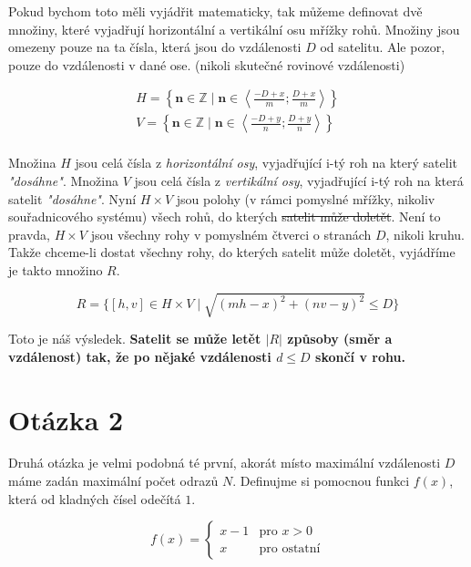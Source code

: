 \documentclass[11pt, a4paper]{article}
\begin{document}
    Pokud bychom toto měli vyjádřit matematicky, tak můžeme definovat dvě množiny, které vyjadřují horizontální a vertikální osu mřížky rohů.
    Množiny jsou omezeny pouze na ta čísla, která jsou do vzdálenosti $D$ od satelitu.
    Ale pozor, pouze do vzdálenosti v dané ose.
    (nikoli skutečné rovinové vzdálenosti)

    \begin{gather*}
        H = \left\{ \mathbf{n} \in \mathbb{Z} \mid \mathbf{n} \in \left\langle \frac{-D+x}{m}; \frac{D+x}{m} \right\rangle \right\}\\
        V = \left\{ \mathbf{n} \in \mathbb{Z} \mid \mathbf{n} \in \left\langle \frac{-D+y}{n}; \frac{D+y}{n} \right\rangle \right\}\\
    \end{gather*}

    Množina $H$ jsou celá čísla z \emph{horizontální osy}, vyjadřující i-tý roh na který satelit \emph{"dosáhne"}.
    Množina $V$ jsou celá čísla z \emph{vertikální osy}, vyjadřující i-tý roh na která satelit \emph{"dosáhne"}.
    Nyní $H \times V$ jsou polohy (v rámci pomyslné mřížky, nikoliv souřadnicového systému) všech rohů, do kterých \sout{satelit může doletět}.
    Není to pravda, $H \times V$ jsou všechny rohy v pomyslném čtverci o stranách $D$, nikoli kruhu.
    Takže chceme-li dostat všechny rohy, do kterých satelit může doletět, vyjádříme je takto množino $R$.

    \[
        R = \{ [h, v] \in H \times V \mid \sqrt{(mh - x)^2+(nv - y)^2} \leq D \}
    \]

    Toto je náš výsledek.
    \textbf{Satelit se může letět $|R|$ způsoby (směr a vzdálenost) tak, že po nějaké vzdálenosti $d \leq D$ skončí v rohu.}


    \section{Otázka 2}
    \label{sec:otazka-2}

    Druhá otázka je velmi podobná té první, akorát místo maximální vzdálenosti $D$ máme zadán maximální počet odrazů $N$.
    Definujme si pomocnou funkci $f(x)$, která od kladných čísel odečítá $1$.

    \[
        f(x) = \begin{cases}
                   x - 1 & \text{pro } x > 0 \\
                   x & \text{pro ostatní}
        \end{cases}
    \]
\end{document}
